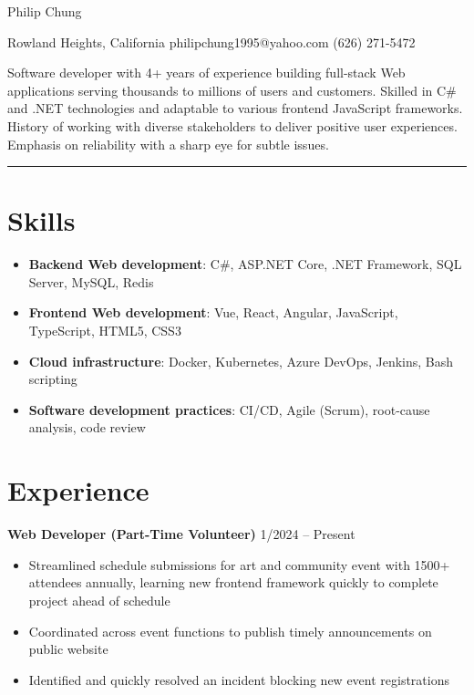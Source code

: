\documentclass[12pt]{article}
\newcommand{\primaryheader}[4]{
	\textbf{#1}
	\ifthenelse{\equal{#3}{}}{}{%
		\symbol{"B7} #3 \ifthenelse{\equal{#4}{}}{}{(#4)}
	}
	\hfill #2%
}
\begin{document}
	{\centering

		{\headerfont\fontsize{24pt}{24pt}\selectfont Philip Chung}

		\vspace{0.25em}

		{\fontsize{10pt}{10pt}\selectfont Rowland Heights, California  philipchung1995@yahoo.com  (626) 271-5472}

	}

	\vspace{0.25em}

	{\fontsize{11pt}{14pt}\selectfont

		Software developer with 4+ years of experience building full-stack Web applications serving thousands to millions of users and customers. Skilled in C\# and .NET technologies and adaptable to various frontend JavaScript frameworks. History of working with diverse stakeholders to deliver positive user experiences. Emphasis on reliability with a sharp eye for subtle issues.

	}

	\rule{\textwidth}{1pt}

	\section*{Skills}

	\newcommand{\skillitem}[2]{\item \textbf{#1}: #2}

	\begin{itemize}[left=0.25in .. 0.25in,label={},itemindent=-0.25in]
		\skillitem{Backend Web development}{C\#, ASP.NET Core, .NET Framework, SQL Server, MySQL, Redis}
		\skillitem{Frontend Web development}{Vue, React, Angular, JavaScript, TypeScript, HTML5, CSS3}
		\skillitem{Cloud infrastructure}{Docker, Kubernetes, Azure DevOps, Jenkins, Bash scripting}
		\skillitem{Software development practices}{CI/CD, Agile (Scrum), root-cause analysis, code review}
	\end{itemize}

	\section*{Experience}

	\primaryheader{Web Developer (Part-Time Volunteer)}{1/2024 -- Present}{PNW}{Remote}

	\begin{itemize}
		\item Streamlined schedule submissions for art and community event with 1500+ attendees annually, learning new frontend framework quickly to complete project ahead of schedule
		\item Coordinated across event functions to publish timely announcements on public website
		\item Identified and quickly resolved an incident blocking new event registrations
	\end{itemize}
\end{document}
